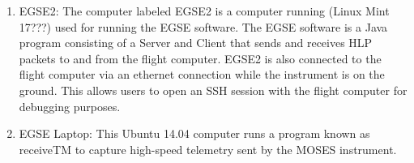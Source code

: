 \begin{enumerate}
\begin{enumerate}
			\item EGSE2: The computer labeled EGSE2 is a computer running (Linux Mint 17???) used for running the EGSE software. The EGSE software is a Java program consisting of a Server and Client that sends and receives HLP packets to and from the flight computer. EGSE2 is also connected to the flight computer via an ethernet connection while the instrument is on the ground. This allows users to open an SSH session with the flight computer for debugging purposes.
			\item EGSE Laptop: This Ubuntu 14.04 computer runs a program known as receiveTM to capture high-speed telemetry sent by the MOSES instrument.
		\end{enumerate}
	\end{enumerate}
